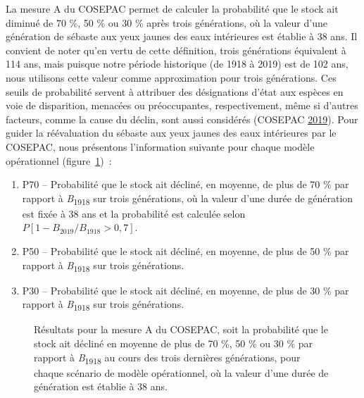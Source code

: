 \documentclass[french,11pt]{book}
\begin{document}
La mesure A du COSEPAC permet de calculer la probabilité que le stock ait diminué de 70 \%, 50 \% ou 30 \% après trois générations, où la valeur d'une génération de sébaste aux yeux jaunes des eaux intérieures est établie à 38 ans. Il convient de noter qu'en vertu de cette définition, trois générations équivalent à 114 ans, mais puisque notre période historique (de 1918 à 2019) est de 102 ans, nous utilisons cette valeur comme approximation pour trois générations. Ces seuils de probabilité servent à attribuer des désignations d'état aux espèces en voie de disparition, menacées ou préoccupantes, respectivement, même si d'autres facteurs, comme la cause du déclin, sont aussi considérés (COSEPAC \protect\hyperlink{ref-cosewic2015}{2019}). Pour guider la réévaluation du sébaste aux yeux jaunes des eaux intérieures par le COSEPAC, nous présentons l'information suivante pour chaque modèle opérationnel (figure~\ref{fig:cosewic-metrics})~:
\begin{enumerate}
\def\labelenumi{\arabic{enumi}.}

\item
  P70 -- Probabilité que le stock ait décliné, en moyenne, de plus de 70 \% par rapport à \emph{B}\textsubscript{1918} sur trois générations, où la valeur d'une durée de génération est fixée à 38 ans et la probabilité est calculée selon \(P[1 - B_{2019}/B_{1918} > 0,7]\).
\item
  P50 -- Probabilité que le stock ait décliné, en moyenne, de plus de 50 \% par rapport à \emph{B}\textsubscript{1918} sur trois générations.
\item
  P30 -- Probabilité que le stock ait décliné, en moyenne, de plus de 30 \% par rapport à \emph{B}\textsubscript{1918} sur trois générations.
\end{enumerate}

\begin{figure}[htb]

{\centering {} 

}

\caption{Résultats pour la mesure A du COSEPAC, soit la probabilité que le stock ait décliné en moyenne de plus de 70 \%, 50 \% ou 30 \% par rapport à \emph{B}\textsubscript{1918} au cours des trois dernières générations, pour chaque scénario de modèle opérationnel, où la valeur d'une durée de génération est établie à 38 ans.}\label{fig:cosewic-metrics}
\end{figure}
\hypertarget{risque-dextinction-mesure-e-du-cosepac}{%
\label{risque-dextinction-mesure-e-du-cosepac}}
\end{document}
